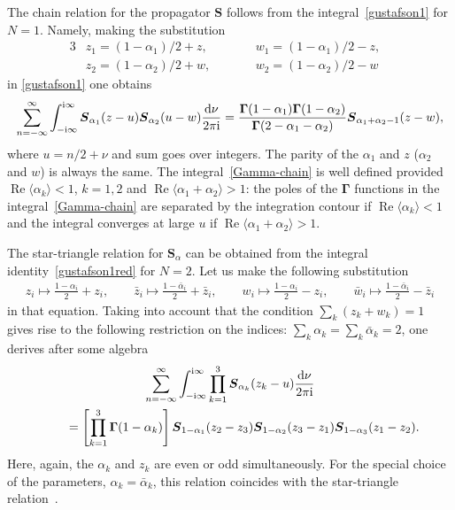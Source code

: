 \documentclass[pdftex]{sigma}
\numberwithin{equation}{section}
\begin{document}
The chain relation for the propagator $\boldsymbol S$ follows from the integral~\eqref{gustafson1} for $N=1$. Namely, making the substitution
\begin{alignat*}{3}
& z_1=(1-\alpha_1)/2+ z,\qquad && w_1=(1-\alpha_1)/2- z, & \\
& z_2=(1-\alpha_2)/2+ w, \qquad && w_2=(1-\alpha_2)/2- w&
\end{alignat*}
in \eqref{gustafson1} one obtains
\begin{gather}\label{Gamma-chain}
\sum_{n=-\infty}^\infty \int_{-{\rm i}\infty}^{{\rm i}\infty}
\boldsymbol S_{\alpha_1}(z-u)\boldsymbol S_{\alpha_2}(u-w) \frac{{\rm d}\nu}{2\pi {\rm i} } =\frac{\boldsymbol\Gamma(1-\alpha_1)\boldsymbol\Gamma(1-\alpha_2)}
{\boldsymbol\Gamma(2-\alpha_1-\alpha_2)} \boldsymbol S_{\alpha_1+\alpha_2-1}(z-w),
\end{gather}
where $u=n/2+\nu$ and sum goes over integers. The parity of the $\alpha_1$ and $z$ ($\alpha_2$ and $w$) is always the
same. The integral~\eqref{Gamma-chain} is well defined provided $\operatorname{Re}\langle \alpha_k\rangle <1$, $k =1,2$ and
$\operatorname{Re}\langle \alpha_1+\alpha_2\rangle > 1$: the poles of the $\boldsymbol\Gamma$ functions in the
integral~\eqref{Gamma-chain} are separated by the integration contour if $\operatorname{Re}\langle\alpha_k\rangle <1$ and the
integral converges at large $u$ if $\operatorname{Re}\langle \alpha_1+\alpha_2\rangle > 1$.

The star-triangle relation for $\boldsymbol S_\alpha$ can be obtained from the integral identity~\eqref{gustafson1red}
for $N=2$. Let us make the following substitution
\begin{gather*}
z_i\mapsto\frac{1-\alpha_i}2+z_i, \qquad \bar z_i\mapsto\frac{1-\bar \alpha_i}2+\bar z_i, \qquad w_i\mapsto\frac{1-\alpha_i}2-z_i,
\qquad \bar w_i\mapsto\frac{1-\bar \alpha_i}2-\bar z_i
\end{gather*}
in that equation. Taking into account that the condition $\sum_k (z_k+w_k)=1$ gives rise to the following restriction on the indices: $\sum_k\alpha_k=\sum_k\bar \alpha_k=2$, one derives after some algebra
\begin{gather}
 \sum_{n=-\infty}^\infty \int_{-{\rm i}\infty}^{{\rm i}\infty}
 \prod_{k=1}^3 \boldsymbol S_{\alpha_k}(z_k-u) \frac{{\rm d}\nu}{2\pi {\rm i} }\nonumber\\
 \qquad{} =\left[\prod_{k=1}^3 \boldsymbol \Gamma(1-\alpha_k)\right]
\boldsymbol S_{1-\alpha_1}(z_2-z_3)\boldsymbol
S_{1-\alpha_2}(z_3-z_1)\boldsymbol S_{1-\alpha_3}(z_1-z_2). \label{Gamma-star-triangle}
\end{gather}
Here, again, the $\alpha_k$ and $z_k$ are even or odd simultaneously. For the special choice of the parameters,
$\alpha_k=\bar\alpha_k$, this relation coincides with the star-triangle relation~\cite[equation~(22)]{Bazhanov:2007vg}.
\end{document}
